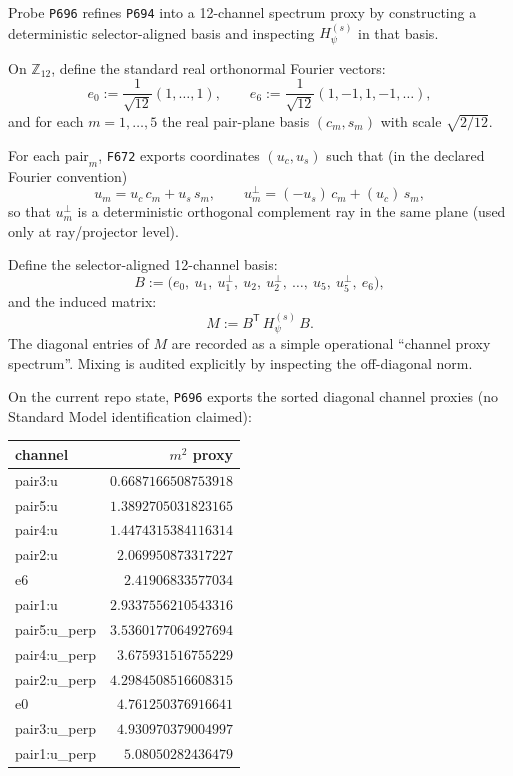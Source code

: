 \documentclass[11pt,a4paper]{article}
\begin{document}
Probe \texttt{P696} refines \texttt{P694} into a 12-channel spectrum proxy by constructing a deterministic selector-aligned basis and inspecting
$H_{\psi}^{(s)}$ in that basis.

On $\mathbb{Z}_{12}$, define the standard real orthonormal Fourier vectors:
\[
e_0 := \frac{1}{\sqrt{12}}(1,\dots,1),\qquad
e_6 := \frac{1}{\sqrt{12}}(1,-1,1,-1,\dots),
\]
and for each $m=1,\dots,5$ the real pair-plane basis $(c_m,s_m)$ with scale $\sqrt{2/12}$.

For each $\mathrm{pair}_m$, \texttt{F672} exports coordinates $(u_c,u_s)$ such that (in the declared Fourier convention)
\[
u_m = u_c\,c_m + u_s\,s_m,
\qquad
u_m^{\perp} = (-u_s)\,c_m + (u_c)\,s_m,
\]
so that $u_m^{\perp}$ is a deterministic orthogonal complement ray in the same plane (used only at ray/projector level).

Define the selector-aligned 12-channel basis:
\[
B := \bigl(e_0,\ u_1,\ u_1^{\perp},\ u_2,\ u_2^{\perp},\ \dots,\ u_5,\ u_5^{\perp},\ e_6\bigr),
\]
and the induced matrix:
\[
M := B^{\mathsf T}\,H_{\psi}^{(s)}\,B.
\]
The diagonal entries of $M$ are recorded as a simple operational “channel proxy spectrum”. Mixing is audited explicitly by inspecting the off-diagonal norm.

On the current repo state, \texttt{P696} exports the sorted diagonal channel proxies (no Standard Model identification claimed):

\begin{center}
\begin{tabular}{lr}
\toprule
channel & $m^2$ proxy\\
\midrule
pair3:u & $0.6687166508753918$\\
pair5:u & $1.3892705031823165$\\
pair4:u & $1.4474315384116314$\\
pair2:u & $2.069950873317227$\\
e6 & $2.41906833577034$\\
pair1:u & $2.9337556210543316$\\
pair5:u\_perp & $3.5360177064927694$\\
pair4:u\_perp & $3.675931516755229$\\
pair2:u\_perp & $4.2984508516608315$\\
e0 & $4.761250376916641$\\
pair3:u\_perp & $4.930970379004997$\\
pair1:u\_perp & $5.08050282436479$\\
\bottomrule
\end{tabular}
\end{center}
\end{document}
